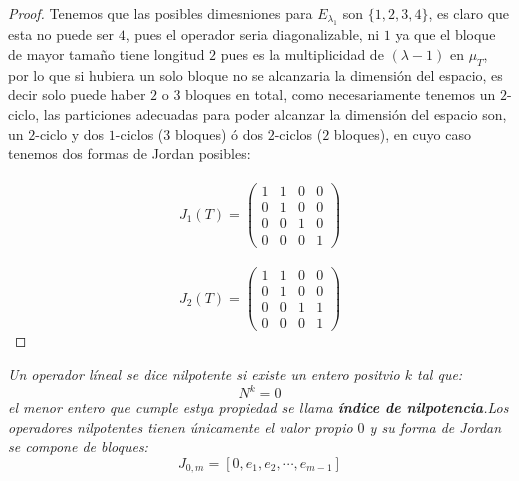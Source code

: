 \documentclass[11pt]{article}
\begin{document}
\begin{proof}
    Tenemos que las posibles dimesniones para $E_{\lambda_1}$ son $\{1,2,3,4\}$, es claro que esta no puede ser $4$, pues el operador seria diagonalizable, ni $1$ ya que el bloque de mayor tamaño tiene longitud $2$ pues es la multiplicidad de $(\lambda-1)$ en $\mu_T$, por lo que si hubiera un solo bloque no se alcanzaria la dimensi\'on del espacio,
    es decir solo puede haber $2$ o $3$ bloques en total, como necesariamente tenemos un $2$-ciclo, las particiones adecuadas para poder alcanzar la dimensi\'on del espacio son, un $2$-ciclo y dos $1$-ciclos ($3$ bloques) \'o dos $2$-ciclos ($2$ bloques), en cuyo caso tenemos dos formas de Jordan posibles:\,\\
    \,\\
    \begin{equation*}
        J_1(T)=\begin{pmatrix}
            1&1&0&0\\
            0&1&0&0\\
            0&0&1&0\\
            0&0&0&1
        \end{pmatrix}
    \end{equation*}\,\\
    \begin{equation*}
        J_2(T)=\begin{pmatrix}
            1&1&0&0\\
            0&1&0&0\\
            0&0&1&1\\
            0&0&0&1
        \end{pmatrix}
    \end{equation*}  
\end{proof}
\begin{tcolorbox}[title = \textcolor{black}{\textcolor{white}{Definici\'on}}]
\textit{Un operador l\'ineal se dice nilpotente si existe un entero positvio $k$ tal que:
\begin{equation*}
    N^k=0
\end{equation*}
el menor entero que cumple estya propiedad se llama \textbf{\'indice de nilpotencia}.Los operadores nilpotentes
tienen \'unicamente el valor propio $0$ y su forma de Jordan se compone de bloques:
\begin{equation*}
    J_{0,m}=[0,e_1,e_2,\cdots,e_{m-1}]
\end{equation*}}
\end{tcolorbox}
\,\\
\end{document}
